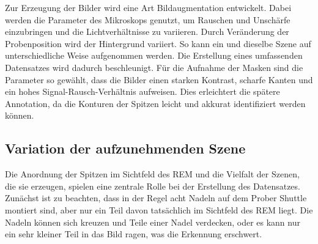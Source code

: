 Zur Erzeugung der Bilder wird eine Art Bildaugmentation entwickelt. Dabei werden die Parameter des Mikroskops genutzt, um Rauschen und Unschärfe einzubringen und die Lichtverhältnisse zu variieren. Durch Veränderung der Probenposition wird der Hintergrund variiert. So kann ein und dieselbe Szene auf unterschiedliche Weise aufgenommen werden. Die Erstellung eines umfassenden Datensatzes wird dadurch beschleunigt.
Für die Aufnahme der Masken sind die Parameter so gewählt, dass die Bilder einen starken Kontrast, scharfe Kanten und ein hohes Signal-Rausch-Verhältnis aufweisen. Dies erleichtert die spätere Annotation, da die Konturen der Spitzen leicht und akkurat identifiziert werden können.

\subsection{Variation der aufzunehmenden Szene}
Die Anordnung der Spitzen im Sichtfeld des REM und die Vielfalt der Szenen, die sie erzeugen, spielen eine zentrale Rolle bei der Erstellung des Datensatzes. 
Zunächst ist zu beachten, dass in der Regel acht Nadeln auf dem Prober Shuttle montiert sind, aber nur ein Teil davon tatsächlich im Sichtfeld des REM liegt. Die Nadeln können sich kreuzen und Teile einer Nadel verdecken, oder es kann nur ein sehr kleiner Teil in das Bild ragen, was die Erkennung erschwert.

